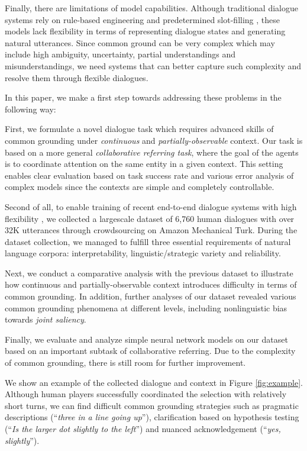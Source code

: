 \documentclass[letterpaper]{article}
\newcommand{\utterance}[1]{``#1''}
\begin{document}
Finally, there are limitations of model capabilities. Although traditional dialogue systems rely on rule-based engineering and predetermined slot-filling \cite{traum1994computational,young2013pomdp,williams2016dialog}, these models lack flexibility in terms of representing dialogue states and generating natural utterances. Since common ground can be very complex which may include high ambiguity, uncertainty, partial understandings and misunderstandings, we need systems that can better capture such complexity and resolve them through flexible dialogues.

In this paper, we make a first step towards addressing these problems in the following way:

First, we formulate a novel dialogue task which requires advanced skills of common grounding under \emph{continuous} and \emph{partially-observable} context. Our task is based on a more general \emph{collaborative referring task}, where the goal of the agents is to coordinate attention on the same entity in a given context. This setting enables clear evaluation based on task success rate and various error analysis of complex models since the contexts are simple and completely controllable.

Second of all, to enable training of recent end-to-end dialogue systems with high flexibility \cite{bordes2016learning,lewis2017deal}, we collected a largescale dataset of 6,760 human dialogues with over 32K utterances through crowdsourcing on Amazon Mechanical Turk. During the dataset collection, we managed to fulfill three essential requirements of natural language corpora: interpretability, linguistic/strategic variety and reliability.

Next, we conduct a comparative analysis with the previous dataset to illustrate how continuous and partially-observable context introduces difficulty in terms of common grounding. In addition, further analyses of our dataset revealed various common grounding phenomena at different levels, including nonlinguistic bias towards \emph{joint saliency}.

Finally, we evaluate and analyze simple neural network models on our dataset based on an important subtask of collaborative referring. Due to the complexity of common grounding, there is still room for further improvement.

We show an example of the collected dialogue and context in Figure \ref{fig:example}. Although human players successfully coordinated the selection with relatively short turns, we can find difficult common grounding strategies such as pragmatic descriptions (\utterance{\textit{three in a line going up}}), clarification based on hypothesis testing (\utterance{\textit{Is the larger dot slightly to the left}}) and nuanced acknowledgement (\utterance{\textit{yes, slightly}}).
\end{document}
